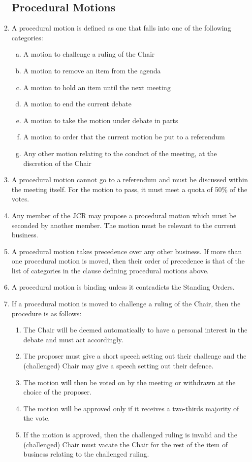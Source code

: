 \documentclass[12pt]{article}  %
\begin{document}
\begin{enumerate}
    \subsection{Procedural Motions}
    \item A procedural motion is defined as one that falls into one of the following categories:
    \begin{enumerate}[(a)]
        \item A motion to challenge a ruling of the Chair
        \item A motion to remove an item from the agenda
        \item A motion to hold an item until the next meeting
        \item A motion to end the current debate
        \item A motion to take the motion under debate in parts
        \item A motion to order that the current motion be put to a referendum
        \item Any other motion relating to the conduct of the meeting, at the discretion of the Chair
    \end{enumerate}
    \item A procedural motion cannot go to a referendum and must be discussed within the meeting itself. For the motion to pass, it must meet a quota of 50\% of the votes.
    \item Any member of the JCR may propose a procedural motion which must be seconded by another member. The motion must be relevant to the current business.
    \item A procedural motion takes precedence over any other business. If more than one procedural motion is moved, then their order of precedence is that of the list of categories in the clause defining procedural motions above.
    \item A procedural motion is binding unless it contradicts the Standing Orders.
    \item If a procedural motion is moved to challenge a ruling of the Chair, then the procedure is as follows:
    \begin{enumerate}
        \item The Chair will be deemed automatically to have a personal interest in the debate and must act accordingly.
        \item The proposer must give a short speech setting out their challenge and the (challenged) Chair may give a speech setting out their defence.
        \item The motion will then be voted on by the meeting or withdrawn at the choice of the proposer.
        \item The motion will be approved only if it receives a two-thirds majority of the vote.
        \item If the motion is approved, then the challenged ruling is invalid and the (challenged) Chair must vacate the Chair for the rest of the item of business relating to the challenged ruling.
    \end{enumerate}

\end{enumerate}
\end{document}
